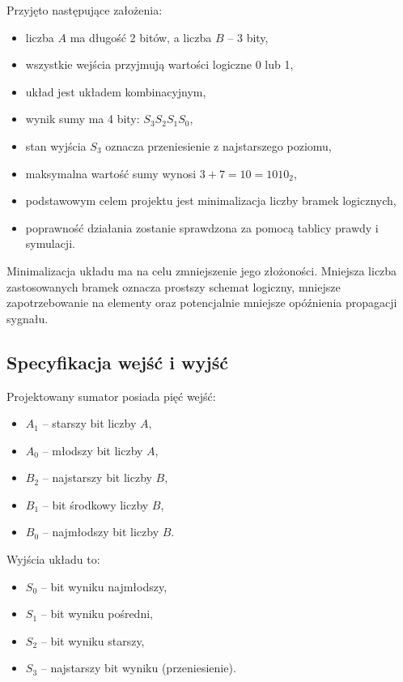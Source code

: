 \documentclass[11pt]{article}
\begin{document}
Przyjęto następujące założenia:
\begin{itemize}
    \item liczba \(A\) ma długość 2 bitów, a liczba \(B\) -- 3 bity,
    \item wszystkie wejścia przyjmują wartości logiczne 0 lub 1,
    \item układ jest układem kombinacyjnym,
    \item wynik sumy ma 4 bity: \(S_3 S_2 S_1 S_0\),
    \item stan wyjścia \(S_3\) oznacza przeniesienie z najstarszego poziomu,
    \item maksymalna wartość sumy wynosi \(3 + 7 = 10 = 1010_2\),
    \item podstawowym celem projektu jest minimalizacja liczby bramek logicznych,
    \item poprawność działania zostanie sprawdzona za pomocą tablicy prawdy i symulacji.
\end{itemize}

Minimalizacja układu ma na celu zmniejszenie jego złożoności. Mniejsza liczba zastosowanych bramek oznacza prostszy schemat logiczny, mniejsze zapotrzebowanie na elementy oraz potencjalnie mniejsze opóźnienia propagacji sygnału.

\subsection{Specyfikacja wejść i wyjść}

Projektowany sumator posiada pięć wejść:
\begin{itemize}
    \item \(A_1\) -- starszy bit liczby \(A\),
    \item \(A_0\) -- młodszy bit liczby \(A\),
    \item \(B_2\) -- najstarszy bit liczby \(B\),
    \item \(B_1\) -- bit środkowy liczby \(B\),
    \item \(B_0\) -- najmłodszy bit liczby \(B\).
\end{itemize}

Wyjścia układu to:
\begin{itemize}
    \item \(S_0\) -- bit wyniku najmłodszy,
    \item \(S_1\) -- bit wyniku pośredni,
    \item \(S_2\) -- bit wyniku starszy,
    \item \(S_3\) -- najstarszy bit wyniku (przeniesienie).
\end{itemize}
\end{document}
